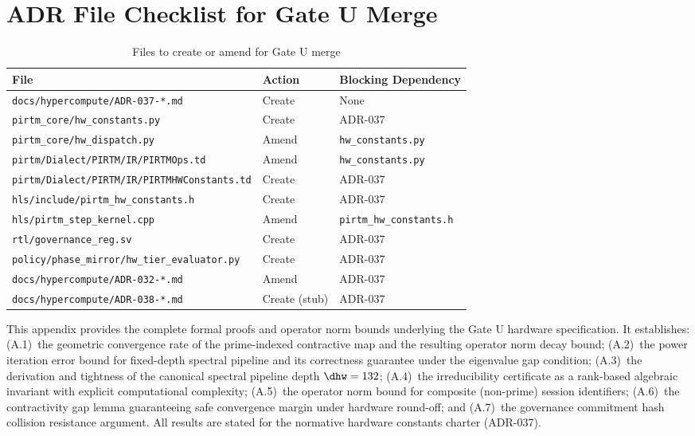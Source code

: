 \documentclass[12pt,letterpaper]{article}
\theoremstyle{plain}
\theoremstyle{definition}
\theoremstyle{remark}
\begin{document}
\section{ADR File Checklist for Gate U Merge}

\begin{table}[H]
\centering
\caption{Files to create or amend for Gate U merge}
\begin{tabular}{lll}
\toprule
\textbf{File} & \textbf{Action} & \textbf{Blocking Dependency} \\
\midrule
\texttt{docs/hypercompute/ADR-037-*.md}       & Create   & None \\
\texttt{pirtm\_core/hw\_constants.py}          & Create   & ADR-037 \\
\texttt{pirtm\_core/hw\_dispatch.py}           & Amend    & \texttt{hw\_constants.py} \\
\texttt{pirtm/Dialect/PIRTM/IR/PIRTMOps.td}   & Amend    & \texttt{hw\_constants.py} \\
\texttt{pirtm/Dialect/PIRTM/IR/PIRTMHWConstants.td} & Create & ADR-037 \\
\texttt{hls/include/pirtm\_hw\_constants.h}   & Create   & ADR-037 \\
\texttt{hls/pirtm\_step\_kernel.cpp}           & Amend    & \texttt{pirtm\_hw\_constants.h} \\
\texttt{rtl/governance\_reg.sv}               & Create   & ADR-037 \\
\texttt{policy/phase\_mirror/hw\_tier\_evaluator.py} & Create & ADR-037 \\
\texttt{docs/hypercompute/ADR-032-*.md}        & Amend    & ADR-037 \\
\texttt{docs/hypercompute/ADR-038-*.md}        & Create (stub) & ADR-037 \\
\bottomrule
\end{tabular}
\end{table}

\appendix

This appendix provides the complete formal proofs and operator norm bounds
underlying the Gate U hardware specification. It establishes: (A.1)~the
geometric convergence rate of the prime-indexed contractive map and the
resulting operator norm decay bound; (A.2)~the power iteration error bound
for fixed-depth spectral pipeline and its correctness guarantee under the
eigenvalue gap condition; (A.3)~the derivation and tightness of the canonical
spectral pipeline depth \(\dhw = 132\); (A.4)~the irreducibility certificate
as a rank-based algebraic invariant with explicit computational complexity;
(A.5)~the operator norm bound for composite (non-prime) session identifiers;
(A.6)~the contractivity gap lemma guaranteeing safe convergence margin under
hardware round-off; and (A.7)~the governance commitment hash collision
resistance argument. All results are stated for the normative hardware
constants charter (ADR-037).
\end{document}
